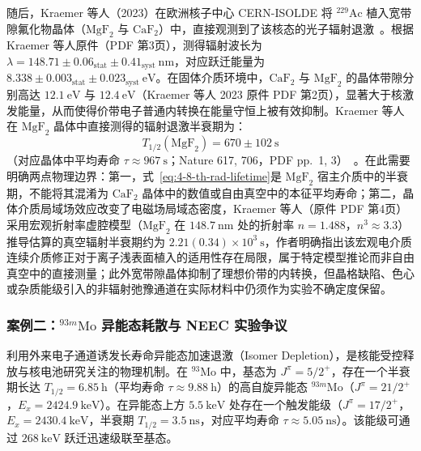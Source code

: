 随后，Kraemer 等人（2023）在欧洲核子中心 CERN-ISOLDE 将 $^{229}\mathrm{Ac}$ 植入宽带隙氟化物晶体（$\mathrm{MgF}_2$ 与 $\mathrm{CaF}_2$）中，直接观测到了该核态的光子辐射退激~\cite{kraemer-2023-radiative-decay-229th-isomer}。根据 Kraemer 等人原件（PDF 第3页），测得辐射波长为 $\lambda = 148.71 \pm 0.06_{\mathrm{stat}} \pm 0.41_{\mathrm{syst}}\ \mathrm{nm}$，对应跃迁能量为 $8.338 \pm 0.003_{\mathrm{stat}} \pm 0.023_{\mathrm{syst}}\ \mathrm{eV}$。在固体介质环境中，$\mathrm{CaF}_2$ 与 $\mathrm{MgF}_2$ 的晶体带隙分别高达 $12.1\ \mathrm{eV}$ 与 $12.4\ \mathrm{eV}$（Kraemer 等人 2023 原件 PDF 第2页），显著大于核激发能量，从而使得价带电子普通内转换在能量守恒上被有效抑制。Kraemer 等人在 $\mathrm{MgF}_2$ 晶体中直接测得的辐射退激半衰期为：
\begin{equation}\label{eq:4-8-th-rad-lifetime}
T_{1/2}(\mathrm{MgF}_2) = 670 \pm 102\ \mathrm{s}
\end{equation}
（对应晶体中平均寿命 $\tau \approx 967\ \mathrm{s}$；Nature 617, 706，PDF pp.~1, 3）~\cite{kraemer-2023-radiative-decay-229th-isomer}。在此需要明确两点物理边界：第一，式~\eqref{eq:4-8-th-rad-lifetime}是 $\mathrm{MgF}_2$ 宿主介质中的半衰期，不能将其混淆为 $\mathrm{CaF}_2$ 晶体中的数值或自由真空中的本征平均寿命；第二，晶体介质局域场效应改变了电磁场局域态密度，Kraemer 等人（原件 PDF 第4页）采用宏观折射率虚腔模型（$\mathrm{MgF}_2$ 在 $148.7\ \mathrm{nm}$ 处的折射率 $n = 1.488$，$n^3 \approx 3.3$）推导估算的真空辐射半衰期约为 $2.21(0.34) \times 10^3\ \mathrm{s}$，作者明确指出该宏观电介质连续介质修正对于离子浅表面植入的适用性存在局限，属于特定模型推论而非自由真空中的直接测量；此外宽带隙晶体抑制了理想价带的内转换，但晶格缺陷、色心或杂质能级引入的非辐射弛豫通道在实际材料中仍须作为实验不确定度保留。

\subsubsection{案例二：$^{93m}\mathrm{Mo}$ 异能态耗散与 NEEC 实验争议}

利用外来电子通道诱发长寿命异能态加速退激（Isomer Depletion），是核能受控释放与核电池研究关注的物理机制。在 $^{93}\mathrm{Mo}$ 中，基态为 $J^\pi = 5/2^+$，存在一个半衰期长达 $T_{1/2} = 6.85\ \mathrm{h}$（平均寿命 $\tau \approx 9.88\ \mathrm{h}$）的高自旋异能态 $^{93m}\mathrm{Mo}$（$J^\pi = 21/2^+$，$E_x = 2424.9\ \mathrm{keV}$）。在异能态上方 $5.5\ \mathrm{keV}$ 处存在一个触发能级（$J^\pi = 17/2^+$，$E_x = 2430.4\ \mathrm{keV}$，半衰期 $T_{1/2} = 3.5\ \mathrm{ns}$，对应平均寿命 $\tau \approx 5.05\ \mathrm{ns}$）。该能级可通过 $268\ \mathrm{keV}$ 跃迁迅速级联至基态。

